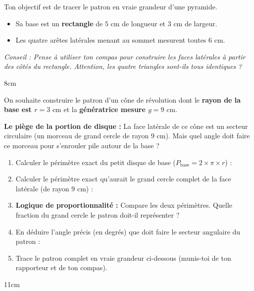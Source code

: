 \documentclass[a4paper]{book}
\begin{document}
    \begin{exercice}
        Ton objectif est de tracer le patron en vraie grandeur d'une pyramide.
        \begin{itemize}
            \item Sa base est un \textbf{rectangle} de $5\text{ cm}$ de longueur et $3\text{ cm}$ de largeur.
            \item Les quatre arêtes latérales menant au sommet mesurent toutes \textbf{$6\text{ cm}$}.
        \end{itemize}
        \textit{Conseil : Pense à utiliser ton compas pour construire les faces latérales à partir des côtés du rectangle. Attention, les quatre triangles sont-ils tous identiques ?}
    \end{exercice}

    \begin{ZoneReponse}{8cm}
    \end{ZoneReponse}

\newpage

    \begin{exercice}
        On souhaite construire le patron d'un cône de révolution dont le \textbf{rayon de la base est $r = 3\text{ cm}$} et la \textbf{génératrice mesure $g = 9\text{ cm}$}.
        
        \textbf{Le piège de la portion de disque :} La face latérale de ce cône est un secteur circulaire (un morceau de grand cercle de rayon $9\text{ cm}$). Mais quel angle doit faire ce morceau pour s'enrouler pile autour de la base ?
        
        \begin{enumerate}
            \item Calculer le périmètre exact du petit disque de base ($P_{\text{base}} = 2 \times \pi \times r$) : \\
            \dotfill
            \item Calculer le périmètre exact qu'aurait le grand cercle complet de la face latérale (de rayon $9\text{ cm}$) : \\
            \dotfill
            \item \textbf{Logique de proportionnalité :} Compare les deux périmètres. Quelle fraction du grand cercle le patron doit-il représenter ? \\
            \dotfill
            \item En déduire l'angle précis (en degrés) que doit faire le secteur angulaire du patron : \\
            \dotfill
            \item Trace le patron complet en vraie grandeur ci-dessous (munis-toi de ton rapporteur et de ton compas).
        \end{enumerate}
    \end{exercice}
    
    \begin{ZoneReponse}{11cm}
    \end{ZoneReponse}
\end{document}
